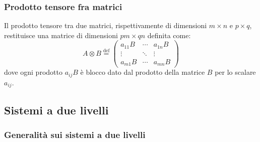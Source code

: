 \documentclass[11pt, a4paper]{scrartcl} %
\numberwithin{equation}{subsection}
\theoremstyle{style2}
\theoremstyle{style1}
\begin{document}
\subsubsection{Prodotto tensore fra matrici}
	Il prodotto tensore tra due matrici, rispettivamente di dimensioni $m \times n$ e $p \times q$, restituisce una matrice di dimensioni $pm  \times  qn$ definita come:
	\begin{equation}
		A \otimes B \overset{\text{def}}{=} \begin{pmatrix} a_{11} B & \cdots & a_{1n} B\\ \vdots & \ddots&\vdots \\ a_{m1}B & \cdots  & a_{mn} B\end{pmatrix} 
	\end{equation}
	dove ogni prodotto $a_{ij} B$ \`e blocco dato dal prodotto della matrice $B$ per lo scalare $a_{ij} $. 
\subsection{Sistemi a due livelli}


\subsubsection{Generalit\`a sui sistemi a due livelli}\label{2lsys}
\end{document}
